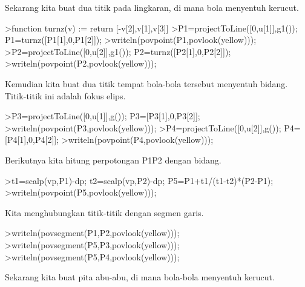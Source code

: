 \documentclass[a4paper,10pt]{article}
\begin{document}
\begin{eulernotebook}
\begin{eulercomment}
\begin{eulercomment}
\begin{eulercomment}
\begin{eulercomment}
\begin{eulercomment}
\begin{eulercomment}
\begin{eulercomment}
\begin{eulercomment}
\begin{eulercomment}
\begin{eulercomment}
\begin{eulercomment}
\begin{eulercomment}
\begin{eulercomment}
\begin{eulercomment}
\begin{eulercomment}
\begin{eulercomment}
\begin{eulercomment}
\begin{eulercomment}
\begin{eulercomment}
\begin{eulercomment}
\begin{eulercomment}
\begin{eulercomment}
\begin{eulercomment}
\begin{eulercomment}
\begin{eulercomment}
\begin{eulercomment}
\begin{eulercomment}
\begin{eulercomment}
\begin{eulercomment}
\begin{eulercomment}
\begin{eulercomment}
Sekarang kita buat dua titik pada lingkaran, di mana bola menyentuh
kerucut.
\end{eulercomment}
\begin{eulerprompt}
>function turnz(v) := return [-v[2],v[1],v[3]]
>P1=projectToLine([0,u[1]],g1()); P1=turnz([P1[1],0,P1[2]]);
>writeln(povpoint(P1,povlook(yellow)));
>P2=projectToLine([0,u[2]],g1()); P2=turnz([P2[1],0,P2[2]]);
>writeln(povpoint(P2,povlook(yellow)));
\end{eulerprompt}
\begin{eulercomment}
Kemudian kita buat dua titik tempat bola-bola tersebut menyentuh
bidang. Titik-titik ini adalah fokus elips.
\end{eulercomment}
\begin{eulerprompt}
>P3=projectToLine([0,u[1]],g()); P3=[P3[1],0,P3[2]];
>writeln(povpoint(P3,povlook(yellow)));
>P4=projectToLine([0,u[2]],g()); P4=[P4[1],0,P4[2]];
>writeln(povpoint(P4,povlook(yellow)));
\end{eulerprompt}
\begin{eulercomment}
Berikutnya kita hitung perpotongan P1P2 dengan bidang.
\end{eulercomment}
\begin{eulerprompt}
>t1=scalp(vp,P1)-dp; t2=scalp(vp,P2)-dp; P5=P1+t1/(t1-t2)*(P2-P1);
>writeln(povpoint(P5,povlook(yellow)));
\end{eulerprompt}
\begin{eulercomment}
Kita menghubungkan titik-titik dengan segmen garis.
\end{eulercomment}
\begin{eulerprompt}
>writeln(povsegment(P1,P2,povlook(yellow)));
>writeln(povsegment(P5,P3,povlook(yellow)));
>writeln(povsegment(P5,P4,povlook(yellow)));
\end{eulerprompt}
\begin{eulercomment}
Sekarang kita buat pita abu-abu, di mana bola-bola menyentuh kerucut.
\end{eulercomment}

\end{eulercomment}
\end{eulercomment}
\end{eulercomment}
\end{eulercomment}
\end{eulercomment}
\end{eulercomment}
\end{eulercomment}
\end{eulercomment}
\end{eulercomment}
\end{eulercomment}
\end{eulercomment}
\end{eulercomment}
\end{eulercomment}
\end{eulercomment}
\end{eulercomment}
\end{eulercomment}
\end{eulercomment}
\end{eulercomment}
\end{eulercomment}
\end{eulercomment}
\end{eulercomment}
\end{eulercomment}
\end{eulercomment}
\end{eulercomment}
\end{eulercomment}
\end{eulercomment}
\end{eulercomment}
\end{eulercomment}
\end{eulercomment}
\end{eulercomment}
\end{eulernotebook}
\end{document}
